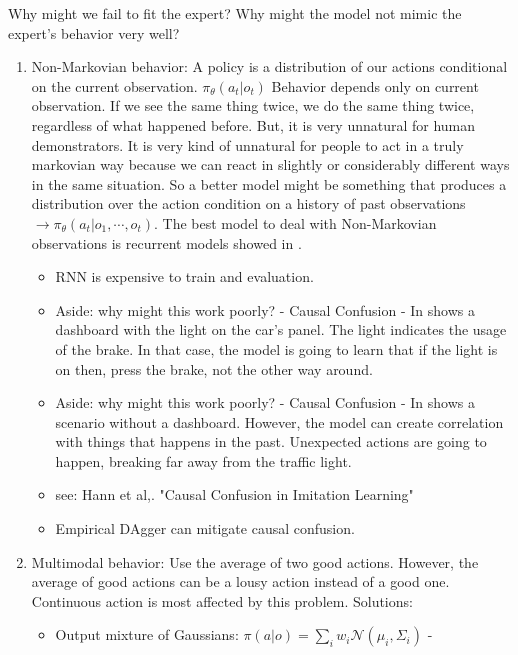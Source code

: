 \documentclass[]{article}
\begin{document}
\par Why might we fail to fit the expert? Why might the model not mimic the expert's behavior very well?
\begin{enumerate}
    \item Non-Markovian behavior: A policy is a distribution of our actions conditional on the current
        observation. $\pi_{\theta}(a_{t}|o_{t})$ Behavior depends only on current observation. If we see the
        same thing twice, we do the same thing twice, regardless of what happened before. But, it is very
        unnatural for human demonstrators. It is very kind of unnatural for people to act in a truly markovian
        way because we can react in slightly or considerably different ways in the same situation. So a better model
        might be something that produces a distribution over the action condition on a history of past observations
        $\rightarrow \pi_{\theta}(a_{t}|o_{1}, \cdots, o_{t})$. The best model to deal with Non-Markovian observations
        is recurrent models showed in . 
    \begin{itemize}
        \item RNN is expensive to train and evaluation.
        \item Aside: why might this work poorly? - Causal Confusion - In 
            shows a dashboard with the light on the car's panel. The light indicates the usage of the brake. In that
            case, the model is going to learn that if the light is on then, press the brake, not the other way around.
        \item Aside: why might this work poorly? - Causal Confusion - In  shows a
            scenario without a dashboard.
            However, the model can create correlation with things that happens in the past. Unexpected actions are going
            to happen, breaking far away from the traffic light.
        \item see: Hann et al,. "Causal Confusion in Imitation Learning"
        \item Empirical DAgger can mitigate causal confusion.
    \end{itemize}
    \item Multimodal behavior: Use the average of two good actions. However, the average of good actions can be a lousy action
        instead of a good one. Continuous action is most affected by this problem. Solutions:
    \begin{itemize}
        \item  Output mixture of Gaussians: $\pi(a|o)  = \sum_{i} w_{i}\mathcal{N}(\mu_{i},\Sigma_{i})$ -

\end{itemize}
\end{enumerate}
\end{document}
